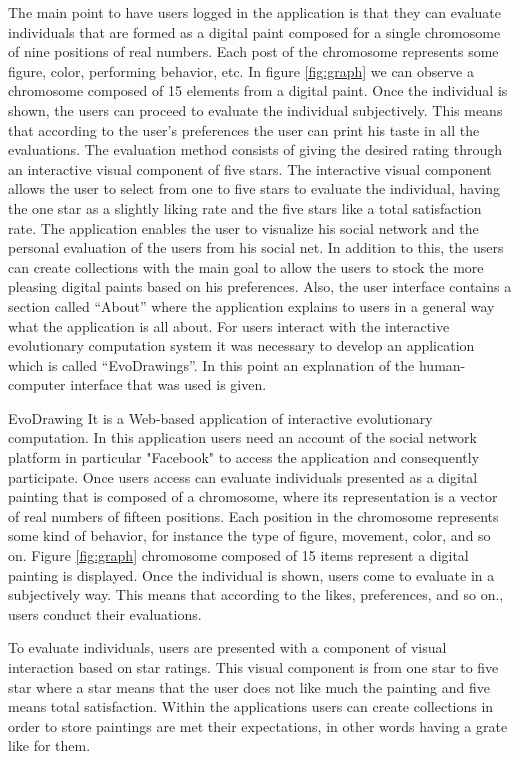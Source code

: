 The main point to have users logged in the application is that they can evaluate individuals that are formed as a digital paint composed for a single chromosome of nine positions of real numbers.
Each post of the chromosome represents some figure, color, performing behavior, etc. In figure \ref{fig:graph} we can observe a chromosome composed of 15 elements from a digital paint. Once the individual is shown, the users can proceed to evaluate the individual subjectively. This means that according to the user's preferences the user can print his taste in all the evaluations.
The evaluation method consists of giving the desired rating through an interactive visual component of five stars. The interactive visual component allows the user to select from one to five stars to evaluate the individual, having the one star as a slightly liking rate and the five stars like a total satisfaction rate. 
The application enables the user to visualize his social network and the personal evaluation of the users from his social net. In addition to this, the users can create collections with the main goal to allow the users to stock the more pleasing digital paints based on his preferences. 
Also, the user interface contains a section called “About” where the application explains to users in a general way what the application is all about.
For users interact with the interactive evolutionary computation system  it was necessary to develop an application which is called “EvoDrawings”. In this point an explanation of the human-computer interface that was used  is given. 

EvoDrawing It is a Web-based application of interactive evolutionary computation. In this application users need an account of the social network platform in particular "Facebook" to access the application and consequently participate. Once users access can evaluate individuals presented as a digital painting that is composed of a chromosome, where its representation is a vector of real numbers of fifteen positions. Each position in the  chromosome  represents some kind of behavior, for instance  the type of figure, movement, color, and so on. Figure \ref{fig:graph} chromosome composed of 15 items represent a digital painting is displayed. Once the individual is shown, users come to evaluate in a subjectively way. This means that according to the likes, preferences, and so on., users conduct their evaluations. 

To evaluate individuals, users are presented with a component of visual interaction based on star ratings. This visual component is from one star to five star where  a star means that the user does not like much the painting and five means total satisfaction. Within the applications users can create collections in order to store paintings are met their expectations, in other words having a grate like for them. 

